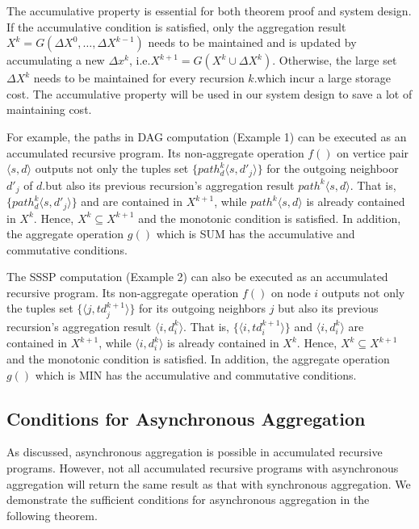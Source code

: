  The accumulative property is essential for both theorem proof and system design. If the accumulative condition is satisfied, only the aggregation result $X^k=G(\Delta X^{0},\ldots,\Delta X^{k-1})$ needs to be maintained and is updated by accumulating a new $\Delta x^{k}$, i.e.$X^{k+1}=G(X^k \cup \Delta X^k)$. Otherwise, the large set $\Delta X^{k}$ needs to be maintained for every recursion $k$.which incur a large storage cost. The accumulative property will be used in our system design to save a lot of maintaining cost.

For example, the paths in DAG computation (Example 1) can be executed as an accumulated recursive program. Its non-aggregate operation $f()$ on vertice pair$\langle s,d\rangle$ outputs not only the tuples set $\{path^k_d\langle s,d'_j\rangle\}$ for the outgoing neighboor $d'_j$ of $d$.but also its previous recursion's aggregation result $path^k\langle s,d\rangle$. That is, $\{path^k_d\langle s,d'_j\rangle\}$ and are contained in $X^{k+1}$, while  $path^k\langle s,d\rangle$ is already contained in $X^{k}$. Hence, $X^{k}\subseteq X^{k+1}$ and the monotonic condition is satisfied. In addition, the aggregate operation $g()$ which is SUM has the accumulative and commutative conditions.

The SSSP computation (Example 2) can also be executed as an accumulated recursive program. Its non-aggregate operation $f()$ on node $i$ outputs not only the tuples set $\{\langle j,td_j^{k+1}\rangle\}$ for its outgoing neighbors $j$ but also its previous recursion's aggregation result $\langle i,d_i^k\rangle$. That is, $\{\langle i,td_i^{k+1}\rangle\}$ and $\langle i,d_i^k\rangle$ are contained in $X^{k+1}$, while $\langle i,d_i^k\rangle$ is already contained in $X^{k}$. Hence, $X^{k}\subseteq X^{k+1}$ and the monotonic condition is satisfied. In addition, the aggregate operation $g()$ which is MIN has the accumulative and commutative conditions.


\subsection{Conditions for Asynchronous Aggregation}
\label{sec:async:condition}

As discussed, asynchronous aggregation is possible in accumulated recursive programs. However, not all accumulated recursive programs with asynchronous aggregation will return the same result as that with synchronous aggregation. We demonstrate the sufficient conditions for asynchronous aggregation in the following theorem.

